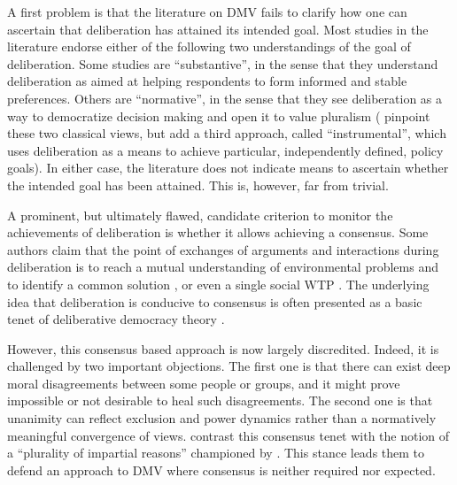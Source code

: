 \documentclass[version=3.21, pagesize, twoside=off, bibliography=totoc, DIV=calc, fontsize=12pt, a4paper, french, english]{scrartcl}
\begin{document}
A first problem is that the literature on \ac{DMV} fails to clarify how one can ascertain that deliberation has attained its intended goal. Most studies in the literature endorse either of the following two understandings of the goal of deliberation. Some studies are “substantive”, in the sense that they understand deliberation as aimed at helping respondents to form informed and stable preferences. Others are “normative”, in the sense that they see deliberation as a way to democratize decision making and open it to value pluralism (\cite{schaafsma_guidance_2018} pinpoint these two classical views, but add a third approach, called “instrumental”, which uses deliberation as a means to achieve particular, independently defined, policy goals). In either case, the literature does not indicate means to ascertain whether the intended goal has been attained. This is, however, far from trivial.

A prominent, but ultimately flawed, candidate criterion to monitor the achievements of deliberation is whether it allows achieving a consensus. Some authors claim that the point of exchanges of arguments and interactions during deliberation is to reach a mutual understanding of environmental problems and to identify a common solution \citep{vatn_institutional_2009}, or even a single social \ac{WTP} \citep{orchard-webb_deliberative_2016}. The underlying idea that deliberation is conducive to consensus is often presented as a basic tenet of deliberative democracy theory \citep{wilson_discourse-based_2002}. 

However, this consensus based approach is now largely discredited. Indeed, it is challenged by two important objections.
The first one is that there can exist deep moral disagreements \citep{dryzek_deliberative_2013} between some people or groups, and it might prove impossible or not desirable to heal such disagreements.
The second one is that unanimity can reflect exclusion and power dynamics \citep{elster_sour_1983,volker_exploring_2016,vargas_background_2016,vargas_problem_2017,murphy_comparing_2017} rather than a normatively meaningful convergence of views.
\citeauthor{bartkowski_beyond_2018} contrast this consensus tenet with the notion of a “plurality of impartial reasons” championed by \citet{sen_idea_2009}.
This stance leads them to defend an approach to \ac{DMV} where consensus is neither required nor expected.
\end{document}
